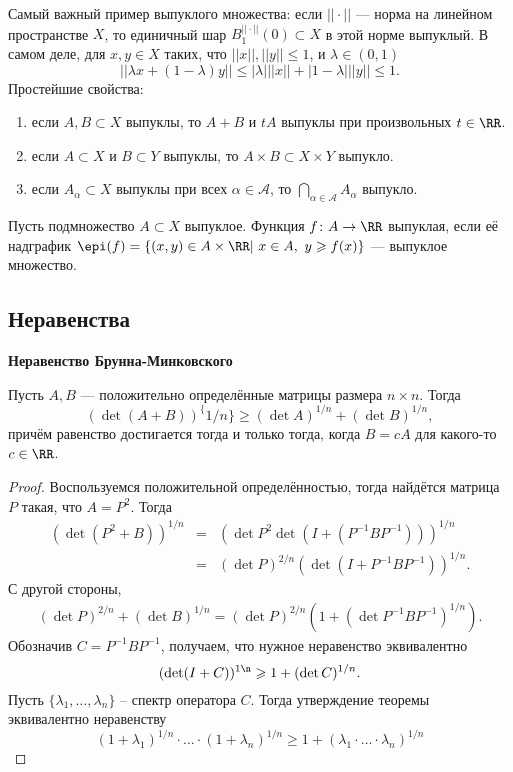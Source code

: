 Самый важный пример выпуклого множества: если $||\cdot||$ --- норма на линейном пространстве $X$, то единичный шар $B^{||\cdot||}_1(0)\subset X$ в этой норме выпуклый. В самом деле, для $x,y\in X$ таких, что $||x||,||y||\leqslant 1$, и $\lambda\in(0,1)$
		\begin{equation*}
			||\lambda x+(1-\lambda)y||\leqslant |\lambda|||x||+|1-\lambda|||y||\leqslant 1.
		\end{equation*}
Простейшие свойства:
\begin{enumerate}
	\item если $A,B\subset X$ выпуклы, то $A+B$ и $tA$ выпуклы при произвольных $t\in\RR$.
	\item если $A\subset X$ и $B\subset Y$ выпуклы, то $A\times B\subset X\times Y$ выпукло.
	\item если $A_{\alpha}\subset X$ выпуклы при всех $\alpha\in\mathcal{A}$, то $\bigcap_{\alpha\in\mathcal{A}} A_{\alpha}$ выпукло.
\end{enumerate}
\begin{defin}
	Пусть подмножество $A\subset X$ выпуклое. Функция $f\colon A\to\RR$ выпуклая, если её надграфик $\epi(f)=\{(x,y)\in A\times\RR| \ x\in A,\ y\geqslant f(x)\}$ --- выпуклое множество.
\end{defin}

\subsection{Неравенства}
\textbf{Неравенство Брунна-Минковского}
\begin{theorem}
Пусть $A,B$ --- положительно определённые матрицы размера $n\times n$. Тогда
	\begin{equation}
		(\det(A+B))^\{1/n\}\geqslant(\det A)^{1/n}+(\det B)^{1/n},
	\end{equation}
причём равенство достигается тогда и только тогда, когда $B=cA$ для какого-то $c\in\RR$.
\end{theorem}
\begin{proof}
	Воспользуемся положительной определённостью, тогда найдётся матрица $P$ такая, что $A=P^2$. Тогда
	\begin{eqnarray*}
		(\det(P^2+B))^{1/n}&=&(\det P^2\det(I+(P^{-1}BP^{-1})))^{1/n}\\
						   &=&(\det P)^{2/n}(\det(I+P^{-1}BP^{-1}))^{1/n}.
	\end{eqnarray*}
	С другой стороны,
	\begin{eqnarray*}
		(\det P)^{2/n}+(\det B)^{1/n}=(\det P)^{2/n}(1+(\det P^{-1}BP^{-1})^{1/n}).
	\end{eqnarray*}
	Обозначив $C=P^{-1}BP^{-1}$, получаем, что нужное неравенство эквивалентно
	\begin{equation}\label{eq:1}
		(\det(I+C))^{1\n}\geqslant 1+(\det C)^{1/n}.
	\end{equation}
	Пусть $\{\lambda_1,\ldots,\lambda_n\}$ -- спектр оператора $C$. Тогда утверждение теоремы эквивалентно неравенству
	\begin{equation}
		(1+\lambda_1)^{1/n}\cdot\ldots\cdot(1+\lambda_n)^{1/n}\geqslant 1+(\lambda_1\cdot\ldots\cdot\lambda_n)^{1/n}
	\end{equation}
\end{proof}


